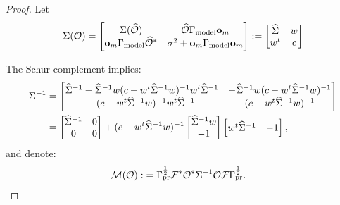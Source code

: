 \documentclass{article}
\begin{document}
\begin{proof}
  Let
  \begin{align*}
    \Sigma( \mathcal{O} ) &= 
    \begin{bmatrix}
      \Sigma (\widehat{\mathcal{O}} )           & \widehat{\mathcal{O}} \Gamma_{\textup{model}} \mathbf{o}_m \\
      \mathbf{o}_m \Gamma_{\textup{model}} \widehat{\mathcal{O}}^*   & \sigma^2 + \mathbf{o}_m \Gamma_{\textup{model}} \mathbf{o}_m
    \end{bmatrix}
    : =
    \begin{bmatrix}
      \widehat{\Sigma}   & w \\
      w^t       & c
    \end{bmatrix}\\
  \end{align*}

  The Schur complement implies:
  \begin{align}\label{eq:schur}
    \begin{split}
          \Sigma^{-1} &=
          \begin{bmatrix}
            \widehat{\Sigma}^{-1} + \widehat{\Sigma}^{-1} w ( c - w^t \widehat{\Sigma}^{-1} w)^{-1} w^t \widehat{\Sigma}^{-1} & - \widehat{\Sigma}^{-1} w ( c - w^t \widehat{\Sigma}^{-1} w)^{-1} \\
            -( c - w^t \widehat{\Sigma}^{-1} w)^{-1} w^t \widehat{\Sigma}^{-1}                            &  ( c - w^t \widehat{\Sigma}^{-1} w)^{-1}
          \end{bmatrix} \\
          &=
          \begin{bmatrix}
            \widehat{\Sigma}^{-1} & 0 \\
            0           & 0 
          \end{bmatrix}
          + (c -w^t \widehat{\Sigma}^{-1} w )^{-1}
          \begin{bmatrix}
            \widehat{\Sigma}^{-1} w \\
            -1
          \end{bmatrix}
          \begin{bmatrix}
            w^t \widehat{\Sigma}^{-1} & -1 
          \end{bmatrix},
    \end{split}
  \end{align}
  and denote:
  \begin{align}\label{eq:M def}
    \mathcal{M} (\mathcal{O} ):&= \Gamma_{\textup{pr}}^{\frac12}\mathcal{F}^* \mathcal{O}^* \Sigma^{-1} \mathcal{O} \mathcal{F}
    \Gamma_{\textup{pr}}^{\frac12}.
  \end{align}
  

\end{proof}
\end{document}
